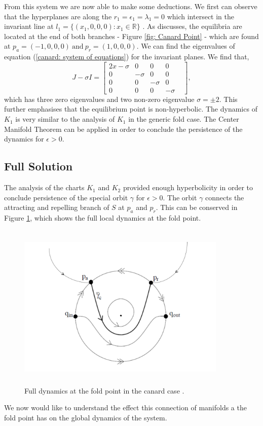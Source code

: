 From this system we are now able to make some deductions. We first can observe that the hyperplanes are along the $r_1=\epsilon_1=\lambda_1=0$ which intersect in the invariant line at $l_1=\{(x_1,0,0,0): x_1\in\mathbb{R}\}$ \citep{krupa2001}. As \citet{krupa2001} discusses, the equilibria are located at the end of both branches - Figure \ref{fig: Canard Point} - which are found at $p_a=(-1,0,0,0) \ \text{and} \ p_r=(1,0,0,0)$. We can find the eigenvalues of equation (\ref{canard: system of equations}) for the invariant planes. We find that, 
\begin{equation}
J-\sigma I= \begin{bmatrix}
2x-\sigma & 0 & 0 & 0  \\
0 & -\sigma & 0 & 0&\\
0 & 0 & -\sigma & 0 \\
0 & 0 & 0 & -\sigma
\end{bmatrix},
\end{equation}
which has three zero eigenvalues and two non-zero eigenvalue $\sigma=\pm 2$. This further emphasises that the equilibrium point is non-hyperbolic. 
The dynamics of $K_1$ is very similar to the analysis of $K_1$ in the generic fold case. The Center Manifold Theorem can be applied in order to conclude the persistence of the dynamics for $\epsilon >0$.

\subsection{Full Solution}
The analysis of the charts $K_1$ and $K_2$ provided enough hyperbolicity in order to conclude persistence of the special orbit $\gamma$ for $\epsilon >0$. The orbit $\gamma$ connects the attracting and repelling branch of $S$ at $p_a$ and $p_r$. This can be conserved in Figure \ref{canardsolloc}, which shows the full local dynamics at the fold point.
\begin{figure}[h!]\centering
	\includegraphics[height=8cm,width=10cm]{Images/pres-cancard}
	\caption{Full dynamics at the fold point in the canard case \citep{krupa2001}.}
	\label{canardsolloc}
\end{figure}
We now would like to understand the effect this connection of manifolds a the fold point has on the global dynamics of the system.

